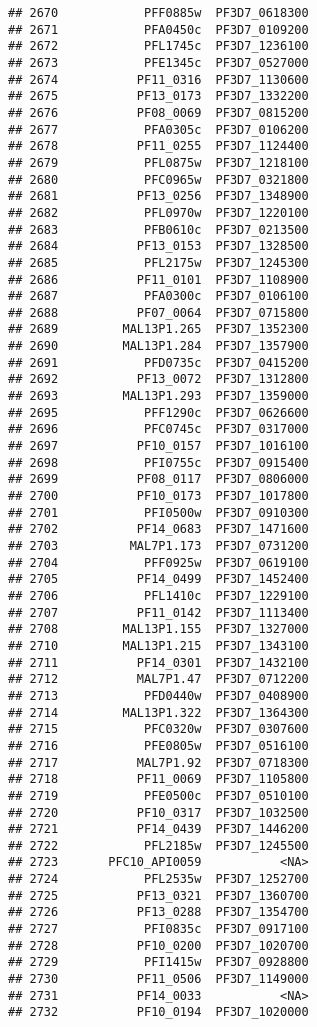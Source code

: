 \documentclass{article}\usepackage[]{graphicx}\usepackage[]{color}
\makeatletter
\newenvironment{kframe}{%
 \def\at@end@of@kframe{}%
 \ifinner\ifhmode%
  \def\at@end@of@kframe{\end{minipage}}%
  \begin{minipage}{\columnwidth}%
 \fi\fi%
 \def\FrameCommand##1{\hskip\@totalleftmargin \hskip-\fboxsep
 \colorbox{shadecolor}{##1}\hskip-\fboxsep
     \hskip-\linewidth \hskip-\@totalleftmargin \hskip\columnwidth}%
 \MakeFramed {\advance\hsize-\width
   \@totalleftmargin\z@ \linewidth\hsize
   \@setminipage}}%
 {\par\unskip\endMakeFramed%
 \at@end@of@kframe}
\newenvironment{knitrout}{}{} %
\makeatother
\begin{document}
\begin{knitrout}
\begin{kframe}
\begin{verbatim}
## 2670            PFF0885w  PF3D7_0618300
## 2671            PFA0450c  PF3D7_0109200
## 2672            PFL1745c  PF3D7_1236100
## 2673            PFE1345c  PF3D7_0527000
## 2674           PF11_0316  PF3D7_1130600
## 2675           PF13_0173  PF3D7_1332200
## 2676           PF08_0069  PF3D7_0815200
## 2677            PFA0305c  PF3D7_0106200
## 2678           PF11_0255  PF3D7_1124400
## 2679            PFL0875w  PF3D7_1218100
## 2680            PFC0965w  PF3D7_0321800
## 2681           PF13_0256  PF3D7_1348900
## 2682            PFL0970w  PF3D7_1220100
## 2683            PFB0610c  PF3D7_0213500
## 2684           PF13_0153  PF3D7_1328500
## 2685            PFL2175w  PF3D7_1245300
## 2686           PF11_0101  PF3D7_1108900
## 2687            PFA0300c  PF3D7_0106100
## 2688           PF07_0064  PF3D7_0715800
## 2689         MAL13P1.265  PF3D7_1352300
## 2690         MAL13P1.284  PF3D7_1357900
## 2691            PFD0735c  PF3D7_0415200
## 2692           PF13_0072  PF3D7_1312800
## 2693         MAL13P1.293  PF3D7_1359000
## 2695            PFF1290c  PF3D7_0626600
## 2696            PFC0745c  PF3D7_0317000
## 2697           PF10_0157  PF3D7_1016100
## 2698            PFI0755c  PF3D7_0915400
## 2699           PF08_0117  PF3D7_0806000
## 2700           PF10_0173  PF3D7_1017800
## 2701            PFI0500w  PF3D7_0910300
## 2702           PF14_0683  PF3D7_1471600
## 2703          MAL7P1.173  PF3D7_0731200
## 2704            PFF0925w  PF3D7_0619100
## 2705           PF14_0499  PF3D7_1452400
## 2706            PFL1410c  PF3D7_1229100
## 2707           PF11_0142  PF3D7_1113400
## 2708         MAL13P1.155  PF3D7_1327000
## 2710         MAL13P1.215  PF3D7_1343100
## 2711           PF14_0301  PF3D7_1432100
## 2712           MAL7P1.47  PF3D7_0712200
## 2713            PFD0440w  PF3D7_0408900
## 2714         MAL13P1.322  PF3D7_1364300
## 2715            PFC0320w  PF3D7_0307600
## 2716            PFE0805w  PF3D7_0516100
## 2717           MAL7P1.92  PF3D7_0718300
## 2718           PF11_0069  PF3D7_1105800
## 2719            PFE0500c  PF3D7_0510100
## 2720           PF10_0317  PF3D7_1032500
## 2721           PF14_0439  PF3D7_1446200
## 2722            PFL2185w  PF3D7_1245500
## 2723       PFC10_API0059           <NA>
## 2724            PFL2535w  PF3D7_1252700
## 2725           PF13_0321  PF3D7_1360700
## 2726           PF13_0288  PF3D7_1354700
## 2727            PFI0835c  PF3D7_0917100
## 2728           PF10_0200  PF3D7_1020700
## 2729            PFI1415w  PF3D7_0928800
## 2730           PF11_0506  PF3D7_1149000
## 2731           PF14_0033           <NA>
## 2732           PF10_0194  PF3D7_1020000

\end{verbatim}
\end{kframe}
\end{knitrout}
\end{document}
